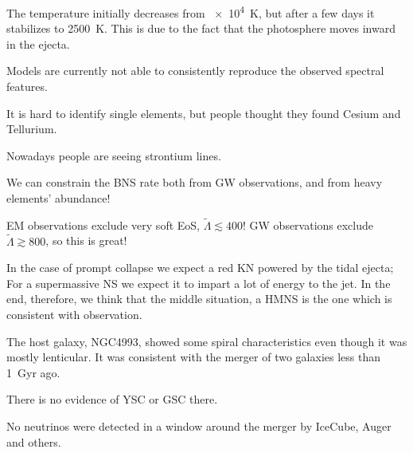 \documentclass[main.tex]{subfiles}
\begin{document}
The temperature initially decreases from \SI{e4}{K}, 
but after a few days it stabilizes to \SI{2500}{K}. 
This is due to the fact that the photosphere moves inward in the ejecta. 

Models are currently not able to consistently reproduce the observed spectral features. 

It is hard to identify single elements, but people thought they found Cesium and Tellurium. 

Nowadays people are seeing strontium lines. 

We can constrain the BNS rate both from GW observations, 
and from heavy elements' abundance! 

EM observations exclude very soft EoS, \(\widetilde{\Lambda} \lesssim 400\)! 
GW observations exclude \(\widetilde{\Lambda} \gtrsim 800\), so this is great! 

In the case of prompt collapse we expect a red KN powered by the tidal ejecta; 
For a supermassive NS we expect it to impart a lot of energy 
to the jet. 
In the end, therefore, we think that the middle situation, a HMNS is the 
one which is consistent with observation. 

The host galaxy, NGC4993,  showed some spiral characteristics even though it was mostly lenticular. 
It was consistent with the merger of two galaxies less than \SI{1}{Gyr} ago. 

There is no evidence of YSC or GSC there. 

No neutrinos were detected in a window around the merger by IceCube, Auger and others.
\end{document}
